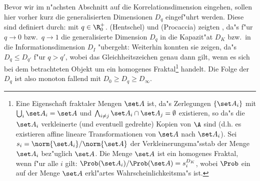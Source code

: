 Bevor wir im n"achsten Abschnitt auf die Korrelationsdimension eingehen, sollen hier
vorher kurz die generalisierten Dimensionen $D_q$ eingef"uhrt werden. Diese sind definiert
durch:
mit $q\in\R_0^+$.
\autor(Hentschel) und \autor(Procaccia) zeigten \cite{Hentschel-procaccia}, da"s
f"ur $q\to0$ bzw.\ $q\to1$ die generalisierte Dimension $D_q$ in die Kapazit"at $D_K$
bzw.\  in die Informationsdimension $D_I$ "ubergeht:
Weiterhin konnten sie zeigen, da"s $D_q\leq D_{q'}$ f"ur $q>q'$, wobei das
Gleichheitszeichen genau dann gilt, wenn es sich bei dem betrachteten Objekt um ein
homogenes Fraktal\footnote{Eine Eigenschaft fraktaler Mengen $\set A$ ist, da"s Zerlegungen $\{\set A_i\}$
  mit $\bigcup_i \set A_i = \set A$ und $\bigwedge_{i\neq j} \set A_i \cap \set A_j =
  \emptyset$ existieren, so da"s die $\set A_i$ verkleinerte (und 
  eventuell gedrehte) Kopien von $\A$ sind (d.h. es existieren affine lineare
  Transformationen von $\set A$ nach $\set A_i$).  Sei $s_i=\norm{\set A_i}/\norm{\set A}$
  der Verkleinerungsma"sstab der Menge $\set A_i$ bez"uglich $\set A$. Die Menge $\set A$ ist ein homogenes Fraktal,
  wenn f"ur alle $i$ gilt: $\Prob(\set A_i)/\Prob(\set A) = s_i^{D_K}$, wobei $\Prob$ ein
  auf der Menge $\set A$ erkl"artes Wahrscheinlichkeitsma"s ist. }
handelt. Die Folge der $D_q$ ist also monoton fallend mit $D_0\geq
D_q\geq D_\infty$. 

